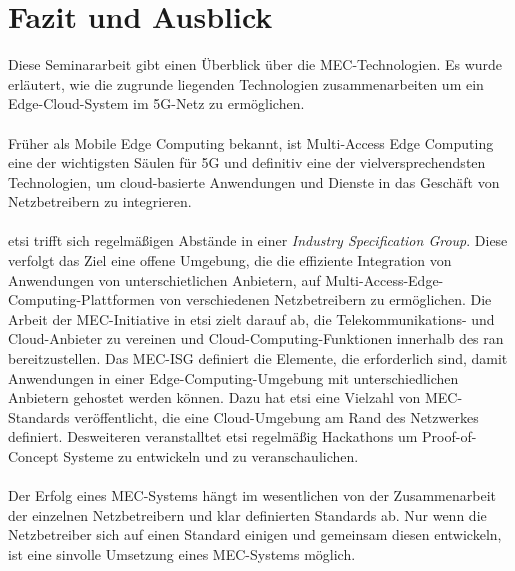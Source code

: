 \documentclass[runningheads]{llncs}
\numberwithin{figure}{section}
\begin{document}
\newpage

\section{Fazit und Ausblick}
Diese Seminararbeit gibt einen Überblick über die MEC-Technologien. Es wurde erläutert, wie die 
zugrunde liegenden
Technologien zusammenarbeiten um ein Edge-Cloud-System im 5G-Netz zu ermöglichen.
\\
\\
Früher als Mobile Edge Computing bekannt, ist Multi-Access Edge Computing eine der 
wichtigsten Säulen für 5G und definitiv eine der vielversprechendsten Technologien, 
um cloud-basierte Anwendungen und Dienste in das Geschäft von Netzbetreibern zu integrieren.
\\
\\
\acrlong{etsi} trifft sich regelmäßigen Abstände in einer \textit{Industry Specification Group}.
Diese verfolgt das Ziel eine
offene Umgebung, die die effiziente Integration von Anwendungen von unterschietlichen Anbietern,
auf Multi-Access-Edge-Computing-Plattformen von verschiedenen Netzbetreibern zu ermöglichen.
Die Arbeit der MEC-Initiative in \acrshort{etsi} zielt darauf ab, 
die Telekommunikations- und Cloud-Anbieter zu vereinen 
und Cloud-Computing-Funktionen innerhalb des \acrfull{ran} bereitzustellen. 
Das MEC-ISG definiert die Elemente, die erforderlich sind, 
damit Anwendungen in einer Edge-Computing-Umgebung mit unterschiedlichen Anbietern gehostet werden können.
Dazu hat \acrlong{etsi} eine Vielzahl von MEC-Standards veröffentlicht, die eine Cloud-Umgebung am Rand des 
Netzwerkes definiert. Desweiteren veranstalltet \acrlong{etsi} regelmäßig Hackathons um Proof-of-Concept Systeme
zu entwickeln und zu veranschaulichen.
\\
\\
Der Erfolg eines MEC-Systems hängt im wesentlichen von der Zusammenarbeit der einzelnen Netzbetreibern 
und klar definierten Standards ab. Nur wenn die Netzbetreiber sich auf einen Standard einigen und gemeinsam diesen
entwickeln, ist eine sinvolle Umsetzung eines MEC-Systems möglich.



\newpage
%
\printbibliography[heading=bibintoc]
\end{document}
